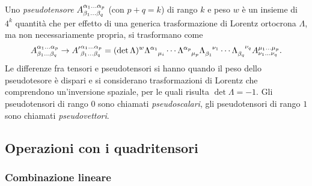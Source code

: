 Uno \emph{pseudotensore}
$\tensor*{A}{^{\alpha_{1}\dots\alpha_{p}}_{\beta_{1}\dots\beta_{q}}}$ (con
$p+q=k$) di rango $k$ e peso $w$ è un insieme di $4^{k}$ quantità che per
effetto di una generica trasformazione di Lorentz ortocrona $\Lambda$, ma non
necessariamente propria, si trasformano come
\begin{equation}
  \tensor*{A}{^{\alpha_{1}\dots\alpha_{p}}_{\beta_{1}\dots\beta_{q}}} \to
  \tensor*{{A'}}{^{\alpha_{1}\dots\alpha_{p}}_{\beta_{1}\dots\beta_{q}}}
  = (\det \Lambda)^{w} \tensor{\Lambda}{^{\alpha_{1}}_{\mu_{i}}} \cdots
  \tensor{\Lambda}{^{\alpha_{p}}_{\mu_{p}}}
  \tensor{\Lambda}{_{\beta_{1}}^{\nu_{1}}} \cdots
  \tensor{\Lambda}{_{\beta_{q}}^{\nu_{q}}}
  \tensor*{A}{^{\mu_{1}\dots\mu_{p}}_{\nu_{1}\dots\nu_{q}}}.
\end{equation}
Le differenze fra tensori e pseudotensori si hanno quando il peso dello
pseudotesore è dispari e si considerano trasformazioni di Lorentz che
comprendono un'inversione spaziale, per le quali risulta $\det\Lambda = -1$.
Gli pseudotensori di rango $0$ sono chiamati \emph{pseudoscalari}, gli
pseudotensori di rango $1$ sono chiamati \emph{pseudovettori}.

\subsection{Operazioni con i quadritensori}
\label{sec:operazioni-tensori-minkowski}

\subsubsection{Combinazione lineare}
\label{sec:combinazione-lineare-minkowski}

